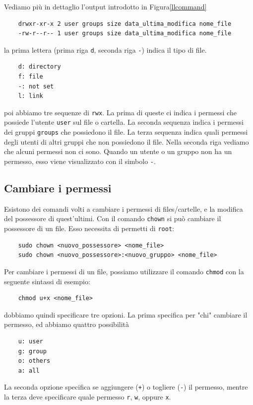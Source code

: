 \documentclass[11pt]{book}
\begin{document}
Vediamo più in dettaglio l'output introdotto in Figura\ref{llcommand}
\begin{verbatim}
	drwxr-xr-x 2 user groups size data_ultima_modifica nome_file
	-rw-r--r-- 1 user groups size data_ultima_modifica nome_file
\end{verbatim}
la prima lettera (prima riga \verb"d", seconda riga \verb"-") indica il tipo di file. 
\begin{verbatim}
	d: directory
	f: file
	-: not set
	l: link
\end{verbatim}
poi abbiamo tre sequenze di \verb"rwx". La prima di queste ci indica i permessi che possiede l'utente \verb"user" sul file o cartella. La seconda sequenza indica i permessi dei gruppi \verb"groups" che possiedono il file. La terza sequenza indica quali permessi degli utenti di altri gruppi che non possiedono il file. Nella seconda riga vediamo che alcuni permessi non ci sono. Quando un utente o un gruppo non ha un permesso, esso viene visualizzato con il simbolo \verb"-".
\subsection{Cambiare i permessi}
Esistono dei comandi volti a cambiare i permessi di files/cartelle, e la modifica del possessore di quest'ultimi. Con il comando \verb"chown" si può cambiare il possessore di un file. Esso necessita di permetti di \verb"root":
\begin{verbatim}
	sudo chown <nuovo_possessore> <nome_file>
	sudo chown <nuovo_possessore>:<nuovo_gruppo> <nome_file>
\end{verbatim}

Per cambiare i permessi di un file, possiamo utilizzare il comando \verb"chmod" con la seguente sintassi di esempio:
\begin{verbatim}
	chmod u+x <nome_file>
\end{verbatim}
dobbiamo quindi specificare tre opzioni. La prima specifica per "chi" cambiare il permesso, ed abbiamo quattro possibilità
\begin{verbatim}
	u: user
	g: group
	o: others
	a: all
\end{verbatim}
La seconda opzione specifica se aggiungere (\verb"+") o togliere (\verb"-") il permesso, mentre la terza deve specificare quale permesso \verb"r", \verb"w", oppure \verb"x".
\end{document}

